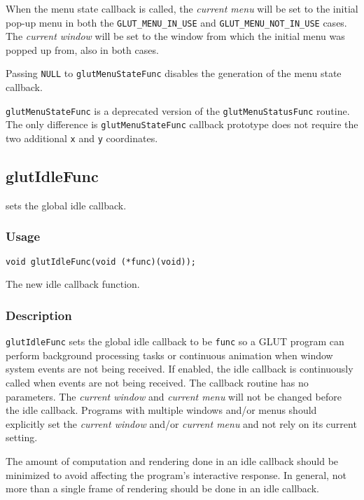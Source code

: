 When the menu state callback is called, the {\em current menu} will be
set to the initial pop-up menu in both the {\tt GLUT\_MENU\_IN\_USE} and
{\tt GLUT\_MENU\_NOT\_IN\_USE} cases.  The {\em current window} will be
set to the window from which the initial menu was popped up from,
also in both cases.

Passing {\tt NULL} to {\tt glutMenuStateFunc}
disables the generation of the menu state callback.

{\tt glutMenuStateFunc} is a deprecated version of the {\tt glutMenuStatusFunc}
routine.  The only difference is {\tt glutMenuStateFunc} callback prototype
does not require the two additional {\tt x} and {\tt y} coordinates.

\subsection{glutIdleFunc}

 sets the global idle callback.

\subsubsection*{Usage}
\begin{verbatim}
void glutIdleFunc(void (*func)(void));
\end{verbatim}
\begin{description}
\itemsep 0in
\item[{\tt func}]
The new idle callback function.
\end{description}

\subsubsection*{Description}

{\tt glutIdleFunc} sets the global idle callback to be {\tt func}
so a GLUT program
can perform background processing tasks or continuous animation when
window system events are not being received.  If enabled, the idle
callback is continuously called when events are not being
received.  The callback routine has no parameters.  The {\em current
window} and {\em current menu} will not be changed before the
idle callback.  Programs with multiple windows and/or menus should
explicitly set the {\em current window} and/or {\em current menu}
and not rely on its current setting.

The amount of computation and rendering done in an idle callback
should be minimized to avoid affecting the program's interactive
response.  In general, not more than a single frame of rendering
should be done in an idle callback.


